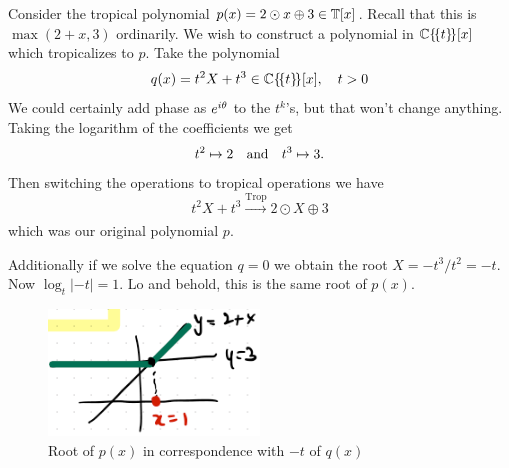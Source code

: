 \documentclass[12pt]{memoir}
\DeclareMathOperator{\Trop}{Trop}
\begin{document}
\begin{Ex}
    Consider the tropical polynomial $p(x)=2\odot x\oplus3\in\mathbb{T}[x]$. Recall that this is $\max(2+x,3)$ ordinarily.
    We wish to construct a polynomial in $\mathbb{C}\{\!\{t\}\!\}[x]$ which tropicalizes to $p$. Take the polynomial 
    $$q(x)=t^2X+t^3\in\mathbb{C}\{\!\{t\}\!\}[x],\quad t>0$$ 
    We could certainly add phase as $e^{i\theta}$ to the $t^k$'s, but that won't change anything. Taking the logarithm of the coefficients we get 
    $$t^2\mapsto 2\quad\text{and}\quad t^3\mapsto 3.$$ 
    Then switching the operations to tropical operations we have
    $$t^2X+t^3\xrightarrow[]{\Trop}2\odot X\oplus 3$$ 
    which was our original polynomial $p$.\par 
    Additionally if we solve the equation $q=0$ we obtain the root $X=-t^3/t^2=-t$. Now $\log_t|-t|=1$. Lo and behold, this is the same root of $p(x)$. 
    \begin{figure}[h!]
        \centering
        \includegraphics[width=0.5\textwidth]{figs/fig4-4CorrespondenceRoots1Example.png}
        \caption{Root of $p(x)$ in correspondence with $-t$ of $q(x)$}
        \label{fig:4.4-CorrespondenceRoots1Example}
    \end{figure}
\end{Ex}
\end{document}
